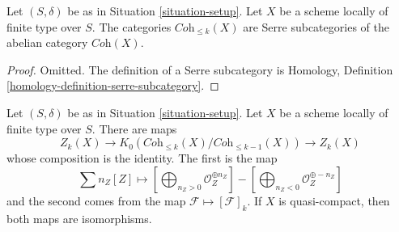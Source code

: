 \begin{lemma}
\label{lemma-Serre-subcategories}
Let $(S, \delta)$ be as in Situation \ref{situation-setup}.
Let $X$ be a scheme locally of finite type over $S$.
The categories $\textit{Coh}_{\leq k}(X)$ are Serre subcategories
of the abelian category $\textit{Coh}(X)$.
\end{lemma}

\begin{proof}
Omitted. The definition of a Serre subcategory is
Homology, Definition \ref{homology-definition-serre-subcategory}.
\end{proof}

\begin{lemma}
\label{lemma-cycles-k-group}
Let $(S, \delta)$ be as in Situation \ref{situation-setup}.
Let $X$ be a scheme locally of finite type over $S$.
There are maps
$$
Z_k(X)
\longrightarrow
K_0(\textit{Coh}_{\leq k}(X)/\textit{Coh}_{\leq k - 1}(X))
\longrightarrow
Z_k(X)
$$
whose composition is the identity. The first is the map
$$
\sum n_Z[Z] \mapsto
\left[\bigoplus\nolimits_{n_Z > 0} \mathcal{O}_Z^{\oplus n_Z}\right]
-
\left[\bigoplus\nolimits_{n_Z < 0} \mathcal{O}_Z^{\oplus -n_Z}\right]
$$
and the second comes from the map $\mathcal{F} \mapsto [\mathcal{F}]_k$.
If $X$ is quasi-compact, then both maps are isomorphisms.
\end{lemma}

